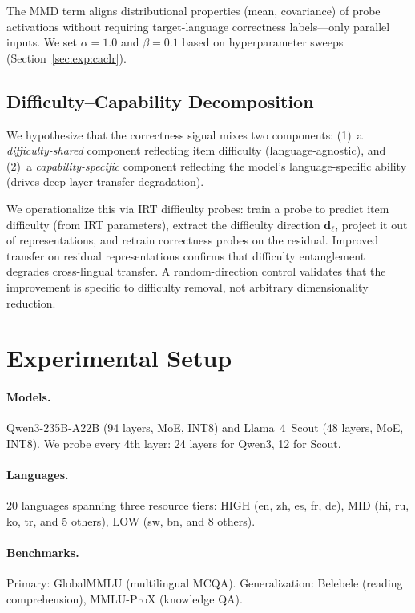 \documentclass[11pt,a4paper]{article}
\begin{document}
The MMD term aligns distributional properties (mean, covariance) of probe activations without requiring target-language correctness labels---only parallel inputs.
We set $\alpha=1.0$ and $\beta=0.1$ based on hyperparameter sweeps (Section~\ref{sec:exp:caclr}).

\subsection{Difficulty--Capability Decomposition}
\label{sec:method:decomp}

We hypothesize that the correctness signal mixes two components:
(1)~a \emph{difficulty-shared} component reflecting item difficulty (language-agnostic), and
(2)~a \emph{capability-specific} component reflecting the model's language-specific ability (drives deep-layer transfer degradation).

We operationalize this via IRT difficulty probes: train a probe to predict item difficulty (from IRT parameters), extract the difficulty direction $\mathbf{d}_\ell$, project it out of representations, and retrain correctness probes on the residual.
Improved transfer on residual representations confirms that difficulty entanglement degrades cross-lingual transfer.
A random-direction control validates that the improvement is specific to difficulty removal, not arbitrary dimensionality reduction.

\section{Experimental Setup}
\label{sec:setup}

\paragraph{Models.}
Qwen3-235B-A22B (94 layers, MoE, INT8) and Llama~4~Scout (48 layers, MoE, INT8).
We probe every 4th layer: 24 layers for Qwen3, 12 for Scout.

\paragraph{Languages.}
20 languages spanning three resource tiers: HIGH (en, zh, es, fr, de), MID (hi, ru, ko, tr, and 5 others), LOW (sw, bn, and 8 others).

\paragraph{Benchmarks.}
Primary: GlobalMMLU (multilingual MCQA).
Generalization: Belebele (reading comprehension), MMLU-ProX (knowledge QA).
\end{document}
